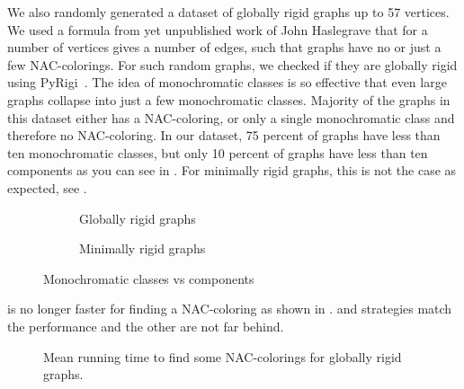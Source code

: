 We also randomly generated a dataset of globally rigid graphs
up to 57 vertices.
We used a formula from yet unpublished work of John Haslegrave
that for a number of vertices gives a number of edges,
such that graphs have no or just a few NAC-colorings.
For such random graphs, we checked if they are globally rigid using PyRigi~\cite{pyrigi}.
%
The idea of monochromatic classes is so effective
that even large graphs collapse into just a few monochromatic classes.
Majority of the graphs in this dataset either has a NAC-coloring,
or only a single monochromatic class and therefore no NAC-coloring.
In our dataset, 75 percent of graphs have less than ten	monochromatic classes,
but only 10 percent of graphs have less than ten \trcon{} components
as you can see in .
For minimally rigid graphs, this is not the case as expected, see
.
%
\begin{figure}[h!]
	\centering
	\begin{subfigure}{0.48\textwidth}
		\centering
		\scalebox{0.6}{}
		\caption[Monoch. classes vs tr. con. components for globally rigid]{%
			\centering Globally rigid graphs}%
		\label{fig:monochrom_vs_triangle_globally_rigid}
	\end{subfigure}
	\hfill
	\begin{subfigure}{0.48\textwidth}
		\centering
		\scalebox{0.6}{}
		\caption[Monoch. classes vs tr. con. components for minimally rigid]{%
			\centering Minimally rigid graphs}%
		\label{fig:monochrom_vs_triangle_minimally_rigid}
	\end{subfigure}
	\caption{Monochromatic classes vs \trcon{} components}%
	\label{fig:monochrom_vs_triangle}
\end{figure}

\NaiveCycles{} is no longer faster for finding a NAC-coloring
as shown in .
\None{} and \Neighbors{} strategies match the performance and
the other are not far behind.
%
\begin{figure}[thbp]
	\centering
	\scalebox{\BenchFigureScale}{}
	\caption[Mean runtime for globally rigid graphs (some).]{
		Mean running time to find some NAC-colorings for globally rigid graphs.}%
	\label{fig:graph_globally_rigid_first_runtime}
\end{figure}%

